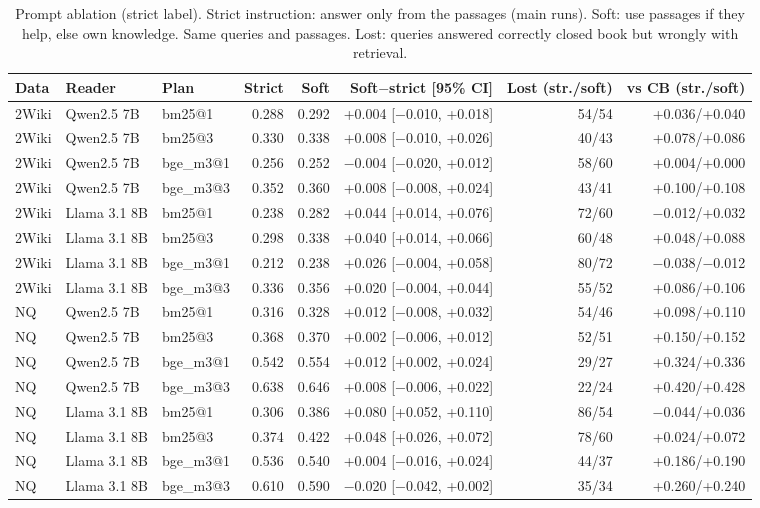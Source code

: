 \begin{table}[t]
\centering
\caption{Prompt ablation (strict label). Strict instruction: answer only from the passages (main runs). Soft: use passages if they help, else own knowledge. Same queries and passages. Lost: queries answered correctly closed book but wrongly with retrieval.}
\label{tab:ablation}
\scriptsize
\setlength{\tabcolsep}{3pt}
\begin{tabular}{lllrrrrr}
\toprule
Data & Reader & Plan & Strict & Soft & Soft$-$strict [95\% CI] & Lost (str./soft) & vs CB (str./soft) \\
\midrule
2Wiki & Qwen2.5 7B & bm25@1 & 0.288 & 0.292 & +0.004 [$-$0.010, +0.018] & 54/54 & +0.036/+0.040 \\
2Wiki & Qwen2.5 7B & bm25@3 & 0.330 & 0.338 & +0.008 [$-$0.010, +0.026] & 40/43 & +0.078/+0.086 \\
2Wiki & Qwen2.5 7B & bge\_m3@1 & 0.256 & 0.252 & $-$0.004 [$-$0.020, +0.012] & 58/60 & +0.004/+0.000 \\
2Wiki & Qwen2.5 7B & bge\_m3@3 & 0.352 & 0.360 & +0.008 [$-$0.008, +0.024] & 43/41 & +0.100/+0.108 \\
2Wiki & Llama 3.1 8B & bm25@1 & 0.238 & 0.282 & +0.044 [+0.014, +0.076] & 72/60 & $-$0.012/+0.032 \\
2Wiki & Llama 3.1 8B & bm25@3 & 0.298 & 0.338 & +0.040 [+0.014, +0.066] & 60/48 & +0.048/+0.088 \\
2Wiki & Llama 3.1 8B & bge\_m3@1 & 0.212 & 0.238 & +0.026 [$-$0.004, +0.058] & 80/72 & $-$0.038/$-$0.012 \\
2Wiki & Llama 3.1 8B & bge\_m3@3 & 0.336 & 0.356 & +0.020 [$-$0.004, +0.044] & 55/52 & +0.086/+0.106 \\
NQ & Qwen2.5 7B & bm25@1 & 0.316 & 0.328 & +0.012 [$-$0.008, +0.032] & 54/46 & +0.098/+0.110 \\
NQ & Qwen2.5 7B & bm25@3 & 0.368 & 0.370 & +0.002 [$-$0.006, +0.012] & 52/51 & +0.150/+0.152 \\
NQ & Qwen2.5 7B & bge\_m3@1 & 0.542 & 0.554 & +0.012 [+0.002, +0.024] & 29/27 & +0.324/+0.336 \\
NQ & Qwen2.5 7B & bge\_m3@3 & 0.638 & 0.646 & +0.008 [$-$0.006, +0.022] & 22/24 & +0.420/+0.428 \\
NQ & Llama 3.1 8B & bm25@1 & 0.306 & 0.386 & +0.080 [+0.052, +0.110] & 86/54 & $-$0.044/+0.036 \\
NQ & Llama 3.1 8B & bm25@3 & 0.374 & 0.422 & +0.048 [+0.026, +0.072] & 78/60 & +0.024/+0.072 \\
NQ & Llama 3.1 8B & bge\_m3@1 & 0.536 & 0.540 & +0.004 [$-$0.016, +0.024] & 44/37 & +0.186/+0.190 \\
NQ & Llama 3.1 8B & bge\_m3@3 & 0.610 & 0.590 & $-$0.020 [$-$0.042, +0.002] & 35/34 & +0.260/+0.240 \\
\bottomrule
\end{tabular}
\end{table}